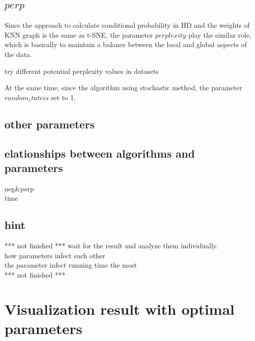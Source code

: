 \subsection{$perp$}

Since the approach to calculate conditional probability in HD and the weights of KNN graph is the same as t-SNE, the parameter $perplexity$ play the similar role, which is basically to maintain a balance between the local and global aspects of the data. 

 try different potential perplexity values in datasets

At the same time, since the algorithm using stochastic method, the parameter $random_stateis$ set to 1.



\subsection{other parameters}

\subsection{elationships between algorithms and parameters}

neg&perp\\

time\\





\subsection{hint}

*** not finished ***
wait for the result and analyze them individually.\\
how parameters infect each other\\
the parameter infect running time the most\\
*** not finished ***

\section{Visualization result with optimal parameters}

